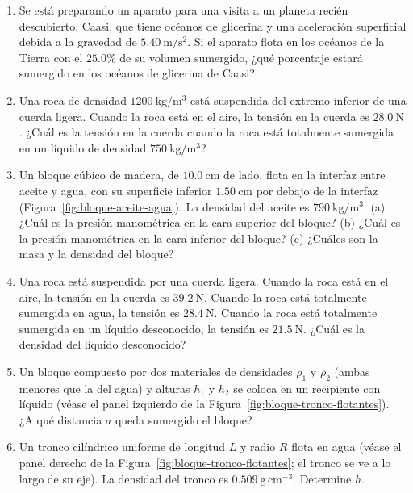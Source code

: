 \begin{enumerate}
\item Se está preparando un aparato para una visita a un planeta recién descubierto, Caasi, que tiene océanos de glicerina y una aceleración superficial debida a la gravedad de $5.40\ \mathrm{m/s^2}$. Si el aparato flota en los océanos de la Tierra con el $25.0\%$ de su volumen sumergido, ¿qué porcentaje estará sumergido en los océanos de glicerina de Caasi?

\item Una roca de densidad $1200\ \mathrm{kg/m^3}$ está suspendida del extremo inferior de una cuerda ligera. Cuando la roca está en el aire, la tensión en la cuerda es $28.0\ \mathrm{N}$. ¿Cuál es la tensión en la cuerda cuando la roca está totalmente sumergida en un líquido de densidad $750\ \mathrm{kg/m^3}$?

\item Un bloque cúbico de madera, de $10.0\ \mathrm{cm}$ de lado, flota en la interfaz entre aceite y agua, con su superficie inferior $1.50\ \mathrm{cm}$ por debajo de la interfaz (Figura~\ref{fig:bloque-aceite-agua}). La densidad del aceite es $790\ \mathrm{kg/m^3}$. (a) ¿Cuál es la presión manométrica en la cara superior del bloque? (b) ¿Cuál es la presión manométrica en la cara inferior del bloque? (c) ¿Cuáles son la masa y la densidad del bloque?

\figuraBloqueAceiteAgua

\item Una roca está suspendida por una cuerda ligera. Cuando la roca está en el aire, la tensión en la cuerda es $39.2\ \mathrm{N}$. Cuando la roca está totalmente sumergida en agua, la tensión es $28.4\ \mathrm{N}$. Cuando la roca está totalmente sumergida en un líquido desconocido, la tensión es $21.5\ \mathrm{N}$. ¿Cuál es la densidad del líquido desconocido?

\item Un bloque compuesto por dos materiales de densidades $\rho_1$ y $\rho_2$ (ambas menores que la del agua) y alturas $h_1$ y $h_2$ se coloca en un recipiente con líquido (véase el panel izquierdo de la Figura~\ref{fig:bloque-tronco-flotantes}). ¿A qué distancia $a$ queda sumergido el bloque?

\item Un tronco cilíndrico uniforme de longitud $L$ y radio $R$ flota en agua (véase el panel derecho de la Figura~\ref{fig:bloque-tronco-flotantes}; el tronco se ve a lo largo de su eje). La densidad del tronco es $0.509\ \mathrm{g\,cm^{-3}}$. Determine $h$.


\end{enumerate}
